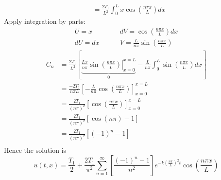 \documentclass[12pt]{article}
\begin{document}
\begin{enumerate}[(a)]
{\begin{align*}
&= \frac{2T_1}{L^2} \int_0^L x \cos \left( \frac{n\pi x}{L} \right) dx
\end{align*}
Apply integration by parts:
\begin{align*}
U = x \;\;\;\;\;\;\;\;& dV = \cos \left( \frac{n\pi x}{L} \right) dx \\
dU = dx \;\;\;\;\;\;\;\;& V = \frac{L}{n\pi} \sin \left( \frac{n\pi x}{L} \right)
\end{align*}
\begin{align*}
C_n &= \frac{2T_1}{L^2} \left[ \underbrace{ \left. \frac{Lx}{n\pi} \sin \left( \frac{n\pi x}{L} \right) \right|_{x=0}^{x=L}}_{0} -  \frac{L}{n\pi} \int_0^L \sin \left( \frac{n\pi x}{L} \right) dx   \right] \\
&= \frac{-2T_1}{n\pi L} \left[ - \frac{L}{n\pi} \cos \left( \frac{n \pi x}{L} \right) \right]_{x=0}^{x=L} \\ 
&= \frac{2T_1}{(n\pi)^2} \left[ \cos \left( \frac{n \pi x}{L} \right) \right]_{x=0}^{x=L} \\
&= \frac{2T_1}{(n\pi)^2} \left[ \cos (n\pi) - 1 \right] \\
&= \frac{2T_1}{(n\pi)^2} \left[ (-1)^n - 1 \right] \\
\end{align*}
Hence the solution is $$\boxed{u(t,x) = \frac{T_1}{2} + \frac{2T_1}{\pi^2} \sum_{n=1}^{\infty} \left[ \frac{(-1)^n - 1}{n^2} \right] e^{- k \left( \frac{n\pi}{L} \right)^2 t} \cos \left( \frac{n\pi x}{L} \right)}$$
}
\end{enumerate}

\vspace{0.3in}
\end{document}
